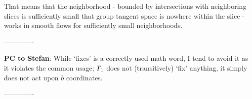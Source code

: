 That means that the neighborhood - bounded by intersections with
neighboring slices is sufficiently small that group tangent space is
nowhere within the slice - works in smooth flows for sufficiently small
neighborhoods.

-------------

{\bf PC to Stefan}:
	While `fixes' is a correctly used math word, I tend to avoid it 	
as it violates the common usage; $T_1$ does not (transitively) `fix'
anything, 	it simply does not act upon $b$ coordinates.

-------------
